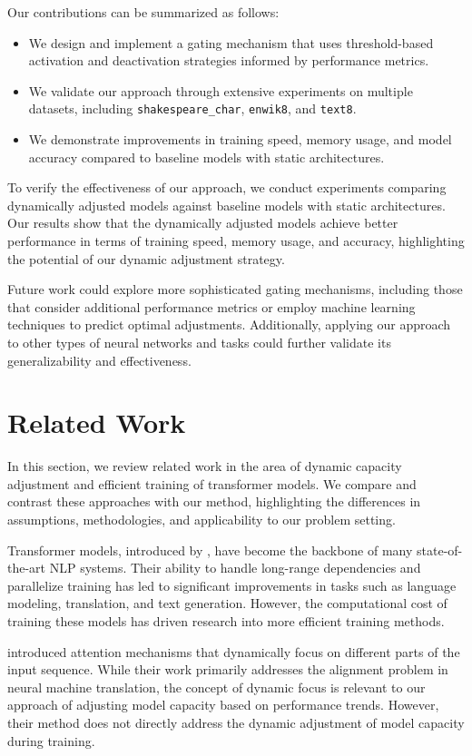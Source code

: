 \documentclass{article} %
\begin{document}
Our contributions can be summarized as follows:
\begin{itemize}
    \item We design and implement a gating mechanism that uses threshold-based activation and deactivation strategies informed by performance metrics.
    \item We validate our approach through extensive experiments on multiple datasets, including \texttt{shakespeare\_char}, \texttt{enwik8}, and \texttt{text8}.
    \item We demonstrate improvements in training speed, memory usage, and model accuracy compared to baseline models with static architectures.
\end{itemize}

To verify the effectiveness of our approach, we conduct experiments comparing dynamically adjusted models against baseline models with static architectures. Our results show that the dynamically adjusted models achieve better performance in terms of training speed, memory usage, and accuracy, highlighting the potential of our dynamic adjustment strategy.

Future work could explore more sophisticated gating mechanisms, including those that consider additional performance metrics or employ machine learning techniques to predict optimal adjustments. Additionally, applying our approach to other types of neural networks and tasks could further validate its generalizability and effectiveness.

\section{Related Work}
\label{sec:related}

In this section, we review related work in the area of dynamic capacity adjustment and efficient training of transformer models. We compare and contrast these approaches with our method, highlighting the differences in assumptions, methodologies, and applicability to our problem setting.

Transformer models, introduced by \citet{vaswani2017attention}, have become the backbone of many state-of-the-art NLP systems. Their ability to handle long-range dependencies and parallelize training has led to significant improvements in tasks such as language modeling, translation, and text generation. However, the computational cost of training these models has driven research into more efficient training methods.

\citet{bahdanau2014neural} introduced attention mechanisms that dynamically focus on different parts of the input sequence. While their work primarily addresses the alignment problem in neural machine translation, the concept of dynamic focus is relevant to our approach of adjusting model capacity based on performance trends. However, their method does not directly address the dynamic adjustment of model capacity during training.
\end{document}
